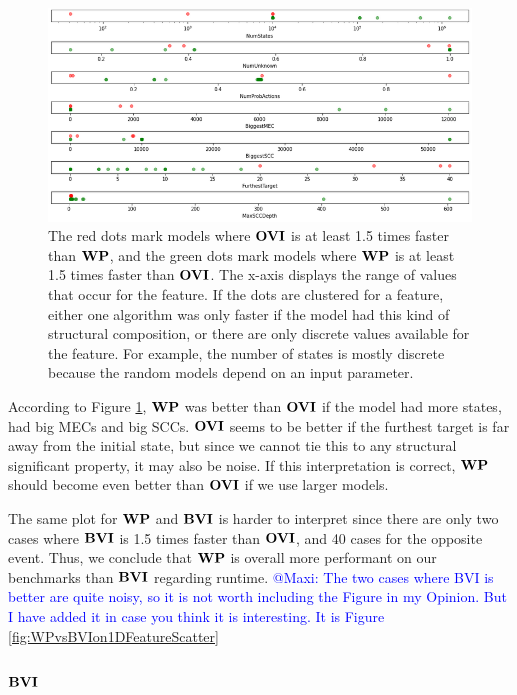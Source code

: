 \begin{figure}[t]
    \centering
    \includegraphics[width=1\textwidth]{figures/WPvsOVIon1DFeatureScatter.png}
    \caption[$\WP$ compared to $\OVI$]{
        The red dots mark models where $\OVI$ is at least 1.5 times faster than $\WP$, and the green dots mark models where $\WP$ is at least 1.5 times faster than $\OVI$.
        The x-axis displays the range of values that occur for the feature. 
        If the dots are clustered for a feature, either one algorithm was only faster if the model had this kind of structural composition, 
        or there are only discrete values available for the feature. For example, the number of states is mostly discrete because the random models depend on an input parameter.
    }
    \label{fig:WPvsOVIon1DFeatureScatter}
\end{figure}

According to Figure \ref{fig:WPvsOVIon1DFeatureScatter}, $\WP$ was better than $\OVI$ if the model had more states, had big MECs and big SCCs.
$\OVI$ seems to be better if the furthest target is far away from the initial state, but since we cannot tie this to any structural significant property,
it may also be noise. If this interpretation is correct, $\WP$ should become even better than $\OVI$ if we use larger models.

The same plot for $\WP$ and $\mathbf{BVI}$ is harder to interpret since there are only two cases where $\mathbf{BVI}$ is 1.5 times faster than $\OVI$, and 40 cases
for the opposite event. Thus, we conclude that $\WP$ is overall more performant on our benchmarks than $\mathbf{BVI}$ regarding runtime. 
\textcolor{blue}{@Maxi: The two cases where BVI is better are quite noisy, so it is not worth including the Figure in my Opinion.
But I have added it in case you think it is interesting. It is Figure \ref{fig:WPvsBVIon1DFeatureScatter}}
\fi

\subsubsection*{$\mathbf{BVI}$}

